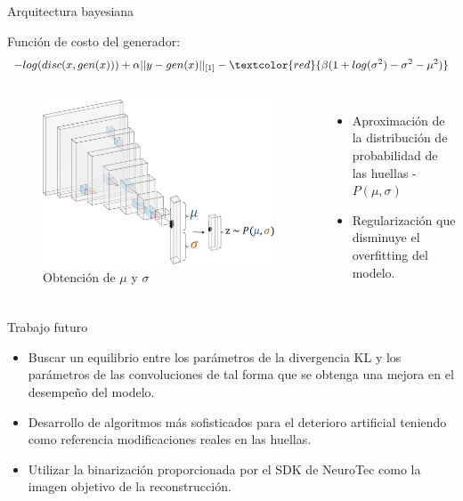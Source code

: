 \documentclass[12pt,aspectratio=169]{beamer}
\begin{document}
\begin{frame}{Arquitectura bayesiana}

    Función de costo del generador:
    \begin{equation}
        - log(disc(x,gen(x)))+\alpha||y-gen(x)||_{[1]}-\textcolor{red}{\beta(1+log(\sigma^{2})-\sigma^{2}-\mu^{2})}
    \end{equation}
    
    \begin{columns}[c] 
            \begin{figure}
                \includegraphics[scale=0.26]{figs/latent_vector.png}
                \caption{Obtención de $\mu$ y $\sigma$}
            \end{figure}
            \begin{itemize}
                \item Aproximación de la distribución de probabilidad de las huellas - $P(\mu,\sigma)$
                \vspace{10mm}
                \item Regularización que disminuye el overfitting del modelo.
            \end{itemize}
    \end{columns}
    
\end{frame}

\begin{frame}{Trabajo futuro}

    \begin{itemize}
        \setlength\itemsep{5mm}
        \item Buscar un equilibrio entre los parámetros de la divergencia KL y los parámetros de las convoluciones de tal forma que se obtenga una mejora en el desempeño del modelo.
        \item Desarrollo de algoritmos más sofisticados para el deterioro artificial teniendo como referencia modificaciones reales en las huellas.
        \item Utilizar la binarización proporcionada por el SDK de NeuroTec como la imagen objetivo de la reconstrucción.
    \end{itemize}

\end{frame}
\end{document}
